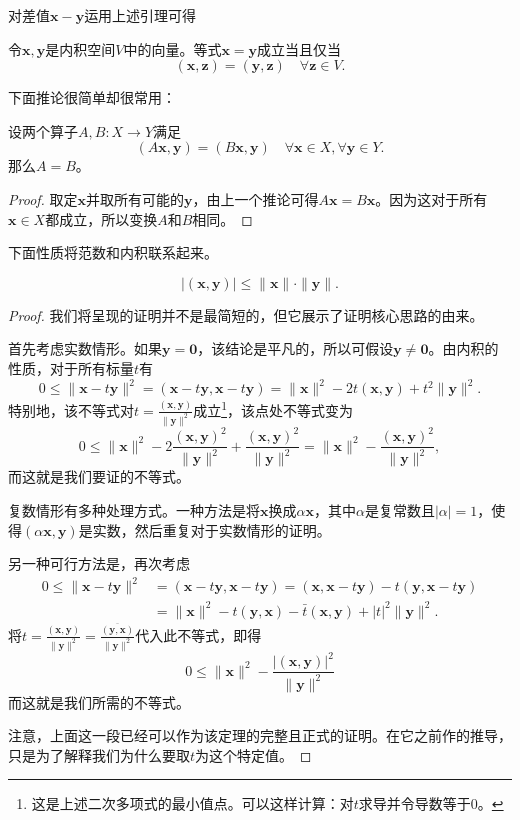 对差值$\mathbf{x}-\mathbf{y}$运用上述引理可得
\begin{corollary}\label{cor:inner_eq_vec_eq}
    令$\mathbf{x},\mathbf{y}$是内积空间$V$中的向量。等式$\mathbf{x}=\mathbf{y}$成立当且仅当\[(\mathbf{x},\mathbf{z})=(\mathbf{y},\mathbf{z})\quad\forall\mathbf{z}\in V.\]
\end{corollary}

下面推论很简单却很常用：
\begin{corollary}\label{cor:Ax_Bx_A_eq_B}
    设两个算子$A,B:X\to Y$满足\[(A\mathbf{x},\mathbf{y})=(B\mathbf{x},\mathbf{y})\quad\forall\mathbf{x}\in X,\forall\mathbf{y}\in Y.\]
    那么$A=B$。
\end{corollary}
\begin{proof}
    取定$\mathbf{x}$并取所有可能的$\mathbf{y}$，由上一个推论可得$A\mathbf{x}=B\mathbf{x}$。因为这对于所有$\mathbf{x}\in X$都成立，所以变换$A$和$B$相同。
\end{proof}

下面性质将范数和内积联系起来。
\begin{theorem}[柯西-施瓦兹不等式]
    \[|(\mathbf{x},\mathbf{y})|\leq\|\mathbf{x}\|\cdot\|\mathbf{y}\|.\]
\end{theorem}
\begin{proof}
    我们将呈现的证明并不是最简短的，但它展示了证明核心思路的由来。

    首先考虑实数情形。如果$\mathbf{y}=\mathbf{0}$，该结论是平凡的，所以可假设$\mathbf{y}\neq \mathbf{0}$。由内积的性质，对于所有标量$t$有\[0\leq\|\mathbf{x}-t\mathbf{y}\|^2=(\mathbf{x}-t\mathbf{y},\mathbf{x}-t\mathbf{y})=\|\mathbf{x}\|^2-2t(\mathbf{x},\mathbf{y})+t^2\|\mathbf{y}\|^2.\]
    特别地，该不等式对$t={\frac{(\mathbf{x},\mathbf{y})}{\|\mathbf{y}\|^{2}}}$成立\footnote{这是上述二次多项式的最小值点。可以这样计算：对$t$求导并令导数等于$0$。}，该点处不等式变为\[0\leq\|\mathbf{x}\|^2-2\frac{(\mathbf{x},\mathbf{y})^2}{\|\mathbf{y}\|^2}+\frac{(\mathbf{x},\mathbf{y})^2}{\|\mathbf{y}\|^2}=\|\mathbf{x}\|^2-\frac{(\mathbf{x},\mathbf{y})^2}{\|\mathbf{y}\|^2},\]
    而这就是我们要证的不等式。

    复数情形有多种处理方式。一种方法是将$\mathbf{x}$换成$\alpha\mathbf{x}$，其中$\alpha$是复常数且$|\alpha|=1$，使得$(\alpha\mathbf{x},\mathbf{y})$是实数，然后重复对于实数情形的证明。

    另一种可行方法是，再次考虑
    \[
    \begin{aligned}
        0\leq\|\mathbf{x}-t\mathbf{y}\|^{2}&=(\mathbf{x}-t\mathbf{y},\mathbf{x}-t\mathbf{y})=(\mathbf{x},\mathbf{x}-t\mathbf{y})-t(\mathbf{y},\mathbf{x}-t\mathbf{y})\\
        &=\|\mathbf{x}\|^{2}-t(\mathbf{y},\mathbf{x})-\bar{t}(\mathbf{x},\mathbf{y})+|t|^{2}\|\mathbf{y}\|^{2}.
    \end{aligned}
    \]
    将$t=\frac{(\mathbf{x},\mathbf{y})}{\|\mathbf{y}\|^{2}}=\frac{\overline{(\mathbf{y},\mathbf{x})}}{\|\mathbf{y}\|^{2}}$代入此不等式，即得\[0\leq\|\mathbf{x}\|^2-\frac{|(\mathbf{x},\mathbf{y})|^2}{\|\mathbf{y}\|^2}\]
    而这就是我们所需的不等式。

    注意，上面这一段已经可以作为该定理的完整且正式的证明。在它之前作的推导，只是为了解释我们为什么要取$t$为这个特定值。
\end{proof}

